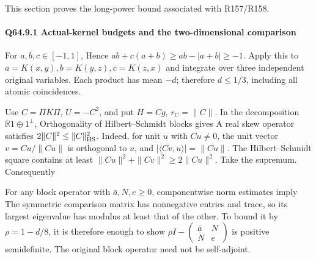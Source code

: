 This section proves the long-power bound associated with R157/R158.

\paragraph{Q64.9.1 Actual-kernel budgets and the two-dimensional comparison}

For \(a,\allowbreak  b,\allowbreak  c\in[-1,\allowbreak  1]\),
Hence \(ab+c(a+b)\ge ab-|a+b|\ge-1\).
Apply this to \(a=K(x,\allowbreak  y),\allowbreak  b=K(y,\allowbreak  z),\allowbreak  c=K(z,\allowbreak  x)\) and integrate over
three independent original variables. Each product has mean \(-d\);
therefore \(d\le1/3\), including all atomic coincidences.

Use \(C=\Pi K\Pi\), \(U=-C^2\), and put \(H=Cg\),
\(r_C=\|C\|\). In the decomposition \(\mathbb R1\oplus1^\perp\),
Orthogonality of Hilbert--Schmidt blocks gives
A real skew operator satisfies \(2\|C\|^2\le\|C\|_{\rm HS}^2\).
Indeed, for unit \(u\) with \(Cu\ne0\), the unit vector
\(v=Cu/\|Cu\|\) is orthogonal to \(u\), and
\(|\langle Cv,\allowbreak  u\rangle|=\|Cu\|\). The Hilbert--Schmidt square
contains at least \(\|Cu\|^2+\|Cv\|^2\ge2\|Cu\|^2\).
Take the supremum. Consequently


For any block operator
with \(\bar a,\allowbreak  N,\allowbreak  e\ge0\), componentwise norm estimates imply
The symmetric comparison matrix has nonnegative entries and trace,
so its largest eigenvalue has modulus at least that of the other.
To bound it by \(\rho=1-d/8\), it is therefore enough to show
\(\rho I-\left(\begin{smallmatrix}\bar a&N\\N&e\end{smallmatrix}\right)\)
is positive semidefinite. The original block operator need not be
self-adjoint.

